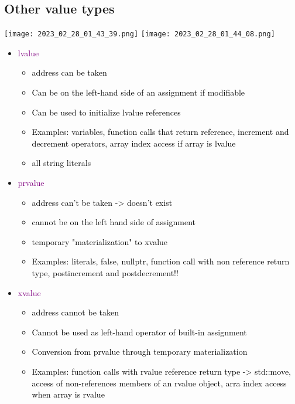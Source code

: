 \documentclass[main.tex,fontsize=8pt,paper=a4,paper=portrait,DIV=calc,]{scrartcl}
\begin{document}
\subsection{Other value types}
\texttt{[image: 2023\_02\_28\_01\_43\_39.png]}
\texttt{[image: 2023\_02\_28\_01\_44\_08.png]}\newline
\begin{itemize}
\item \textcolor{purple}{lvalue}
  \begin{itemize}
  \item \textcolor{black}{address can be taken}
  \item \textcolor{black}{Can be on the left-hand side of an assignment if modifiable}
  \item \textcolor{black}{Can be used to initialize lvalue references}
  \item \textcolor{black}{Examples: variables, function calls that return reference, increment and decrement operators, array index access if array is lvalue}
  \item all string literals
  \end{itemize} 
\item \textcolor{purple}{prvalue}
  \begin{itemize}
  \item \textcolor{black}{address can't be taken -> doesn't exist}
  \item \textcolor{black}{cannot be on the left hand side of assignment}
  \item \textcolor{black}{temporary "materialization" to xvalue}
  \item \textcolor{black}{Examples: literals, false, nullptr, function call with non reference return type, postincrement and postdecrement!! }
  \end{itemize} 
\item \textcolor{purple}{xvalue}
  \begin{itemize}
  \item \textcolor{black}{address cannot be taken}
  \item \textcolor{black}{Cannot be used as left-hand operator of built-in assignment}
  \item \textcolor{black}{Conversion from prvalue through temporary materialization}
  \item \textcolor{black}{Examples: function calls with rvalue reference return type -> std::move, access of non-references members of an rvalue object, arra index access when array is rvalue}
  \end{itemize} 
\end{itemize}
\end{document}
